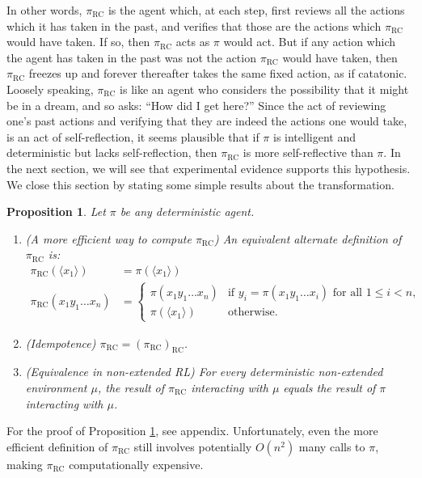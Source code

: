 \documentclass{article}
\newtheorem{myproposition}[mytheorem]{Proposition}
\def\RC{\textrm{RC}}
\begin{document}
In other words, $\pi_{\RC}$ is the agent which, at each step, first reviews all the actions
which it has taken in the past, and verifies that those are the actions which $\pi_{\RC}$ would
have taken. If so, then $\pi_{\RC}$ acts as $\pi$ would act. But if any action which
the agent has taken in the past was not the action $\pi_{\RC}$ would have taken, then
$\pi_{\RC}$ freezes up and forever thereafter takes the same fixed action, as if catatonic.
Loosely speaking, $\pi_{\RC}$ is like an agent who considers the possibility that it might
be in a dream, and so asks: ``How did I get here?''
Since the act of reviewing one's past actions and verifying that they are indeed the actions
one would take, is an act of self-reflection, it seems plausible that if $\pi$
is intelligent and deterministic but lacks self-reflection, then $\pi_{\RC}$ is
more self-reflective than $\pi$. In the next section, we will see that experimental
evidence supports this hypothesis. We close this section by stating some simple results
about the transformation.

\begin{myproposition}
\label{transformationproposition}
  Let $\pi$ be any deterministic agent.
  \begin{enumerate}
    \item
    (A more efficient way to compute $\pi_{\RC}$)
    An equivalent alternate definition of $\pi_{\RC}$ is:
    \begin{align*}
      \pi_{\RC}(\langle x_1\rangle) &= \pi(\langle x_1\rangle)\\
      \pi_{\RC}(x_1y_1\ldots x_n) &=
      \begin{cases}
        \pi(x_1y_1\ldots x_n) & \mbox{if $y_i=\pi(x_1y_1\ldots x_i)$ for all $1\leq i<n$,}\\
        \pi(\langle x_1\rangle) & \mbox{otherwise.}
      \end{cases}
    \end{align*}
    \item
    (Idempotence) $\pi_{\RC}=(\pi_{\RC})_{\RC}$.
    \item
    (Equivalence in non-extended RL)
    For every deterministic non-extended environment $\mu$, the result of $\pi_{\RC}$
    interacting with $\mu$ equals the result of $\pi$ interacting with $\mu$.
  \end{enumerate}
\end{myproposition}

For the proof of Proposition \ref{transformationproposition}, see appendix.
Unfortunately, even the more efficient definition of $\pi_{\RC}$ still involves
potentially $O(n^2)$ many calls to $\pi$, making $\pi_{\RC}$ computationally
expensive.
\end{document}
